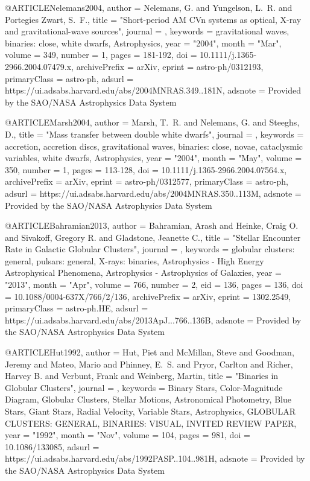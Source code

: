\documentclass[twocolumn,tighten]{aastex63}
\begin{document}
@ARTICLE{Nelemans2004,
       author = {{Nelemans}, G. and {Yungelson}, L.~R. and {Portegies Zwart}, S.~F.},
        title = "{Short-period AM CVn systems as optical, X-ray and gravitational-wave sources}",
      journal = {\mnras},
     keywords = {gravitational waves, binaries: close, white dwarfs, Astrophysics},
         year = "2004",
        month = "Mar",
       volume = {349},
       number = {1},
        pages = {181-192},
          doi = {10.1111/j.1365-2966.2004.07479.x},
archivePrefix = {arXiv},
       eprint = {astro-ph/0312193},
 primaryClass = {astro-ph},
       adsurl = {https://ui.adsabs.harvard.edu/abs/2004MNRAS.349..181N},
      adsnote = {Provided by the SAO/NASA Astrophysics Data System}
}

@ARTICLE{Marsh2004,
       author = {{Marsh}, T.~R. and {Nelemans}, G. and {Steeghs}, D.},
        title = "{Mass transfer between double white dwarfs}",
      journal = {\mnras},
     keywords = {accretion, accretion discs, gravitational waves, binaries: close, novae, cataclysmic variables, white dwarfs, Astrophysics},
         year = "2004",
        month = "May",
       volume = {350},
       number = {1},
        pages = {113-128},
          doi = {10.1111/j.1365-2966.2004.07564.x},
archivePrefix = {arXiv},
       eprint = {astro-ph/0312577},
 primaryClass = {astro-ph},
       adsurl = {https://ui.adsabs.harvard.edu/abs/2004MNRAS.350..113M},
      adsnote = {Provided by the SAO/NASA Astrophysics Data System}
}

@ARTICLE{Bahramian2013,
       author = {{Bahramian}, Arash and {Heinke}, Craig O. and {Sivakoff}, Gregory R. and
         {Gladstone}, Jeanette C.},
        title = "{Stellar Encounter Rate in Galactic Globular Clusters}",
      journal = {\apj},
     keywords = {globular clusters: general, pulsars: general, X-rays: binaries, Astrophysics - High Energy Astrophysical Phenomena, Astrophysics - Astrophysics of Galaxies},
         year = "2013",
        month = "Apr",
       volume = {766},
       number = {2},
          eid = {136},
        pages = {136},
          doi = {10.1088/0004-637X/766/2/136},
archivePrefix = {arXiv},
       eprint = {1302.2549},
 primaryClass = {astro-ph.HE},
       adsurl = {https://ui.adsabs.harvard.edu/abs/2013ApJ...766..136B},
      adsnote = {Provided by the SAO/NASA Astrophysics Data System}
}

@ARTICLE{Hut1992,
       author = {{Hut}, Piet and {McMillan}, Steve and {Goodman}, Jeremy and
         {Mateo}, Mario and {Phinney}, E.~S. and {Pryor}, Carlton and
         {Richer}, Harvey B. and {Verbunt}, Frank and {Weinberg}, Martin},
        title = "{Binaries in Globular Clusters}",
      journal = {\pasp},
     keywords = {Binary Stars, Color-Magnitude Diagram, Globular Clusters, Stellar Motions, Astronomical Photometry, Blue Stars, Giant Stars, Radial Velocity, Variable Stars, Astrophysics, GLOBULAR CLUSTERS: GENERAL, BINARIES: VISUAL, INVITED REVIEW PAPER},
         year = "1992",
        month = "Nov",
       volume = {104},
        pages = {981},
          doi = {10.1086/133085},
       adsurl = {https://ui.adsabs.harvard.edu/abs/1992PASP..104..981H},
      adsnote = {Provided by the SAO/NASA Astrophysics Data System}
}
\end{document}
